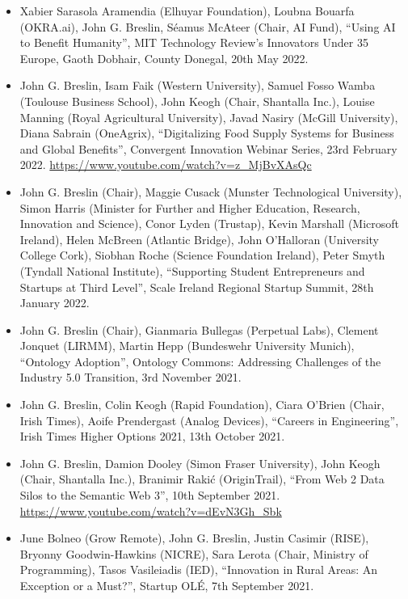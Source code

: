 \documentclass[10pt,a4paper]{res} %
\begin{document}
\begin{resume}
\begin{itemize} \itemsep -2pt
\item Xabier Sarasola Aramendia (Elhuyar Foundation), Loubna Bouarfa (OKRA.ai), John G. Breslin, S\'{e}amus McAteer (Chair, AI Fund), ``Using AI to Benefit Humanity'', MIT Technology Review's Innovators Under 35 Europe, Gaoth Dobhair, County Donegal, 20th May 2022. %
\item John G. Breslin, Isam Faik (Western University), Samuel Fosso Wamba (Toulouse Business School), John Keogh (Chair, Shantalla Inc.), Louise Manning (Royal Agricultural University), Javad Nasiry (McGill University), Diana Sabrain (OneAgrix), ``Digitalizing Food Supply Systems for Business and Global Benefits'', Convergent Innovation Webinar Series, 23rd February 2022. \url{https://www.youtube.com/watch?v=z_MjBvXAsQc} %
\item John G. Breslin (Chair), Maggie Cusack (Munster Technological University), Simon Harris (Minister for Further and Higher Education, Research, Innovation and Science), Conor Lyden (Trustap), Kevin Marshall (Microsoft Ireland), Helen McBreen (Atlantic Bridge), John O'Halloran (University College Cork), Siobhan Roche (Science Foundation Ireland), Peter Smyth (Tyndall National Institute), ``Supporting Student Entrepreneurs and Startups at Third Level'', Scale Ireland Regional Startup Summit, 28th January 2022.
\item John G. Breslin (Chair), Gianmaria Bullegas (Perpetual Labs), Clement Jonquet (LIRMM), Martin Hepp (Bundeswehr University Munich), ``Ontology Adoption'', Ontology Commons: Addressing Challenges of the Industry 5.0 Transition, 3rd November 2021.
\item John G. Breslin, Colin Keogh (Rapid Foundation), Ciara O'Brien (Chair, Irish Times), Aoife Prendergast (Analog Devices), ``Careers in Engineering'', Irish Times Higher Options 2021, 13th October 2021.
\item John G. Breslin, Damion Dooley (Simon Fraser University), John Keogh (Chair, Shantalla Inc.), Branimir Raki\'{c} (OriginTrail), ``From Web 2 Data Silos to the Semantic Web 3'', 10th September 2021. \url{https://www.youtube.com/watch?v=dEvN3Gh_Sbk}
\item June Bolneo (Grow Remote), John G. Breslin, Justin Casimir (RISE), Bryonny Goodwin-Hawkins (NICRE), Sara Lerota (Chair, Ministry of Programming), Tasos Vasileiadis (IED), ``Innovation in Rural Areas: An Exception or a Must?'', Startup OL\'{E}, 7th September 2021.

\end{itemize}
\end{resume}
\end{document}
